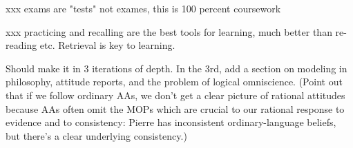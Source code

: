 \documentclass{../wobook2017}
\begin{document}
{xxx exams are "tests" not exames, this is 100 percent coursework

xxx practicing and recalling are the best tools for learning, much
better than re-reading etc. Retrieval is key to learning.



  Should make it in 3 iterations of depth. In the 3rd, add a section
  on modeling in philosophy, attitude reports, and the problem of
  logical omniscience. (Point out that if we follow ordinary AAs, we
  don't get a clear picture of rational attitudes because AAs often
  omit the MOPs which are crucial to our rational response to evidence
  and to consistency: Pierre has inconsistent ordinary-language
  beliefs, but there's a clear underlying consistency.)
} %












\end{document}
